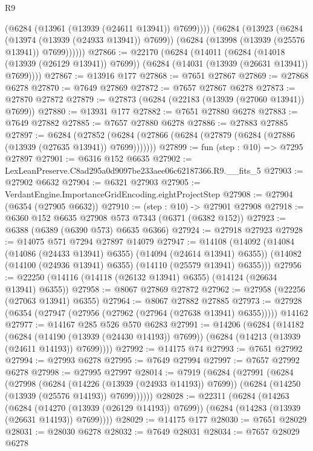 \begin{lexlean}{R9}
\begin{coremodule}
            (@6284 (@13961 (@13939 (@24611 @13941)) @7699))))
        (@6284
          (@13923
            (@6284 (@13974 (@13939 (@24933 @13941)) @7699))
            (@6284 (@13998 (@13939 (@25576 @13941)) @7699))))))
@27866 := @22170
    (@6284
      (@14011
        (@6284 (@14018 (@13939 (@26129 @13941)) @7699))
        (@6284 (@14031 (@13939 (@26631 @13941)) @7699))))
@27867 := @13916 @177
@27868 := @7651 @27867
@27869 := @27868 @6278
@27870 := @7649 @27869
@27872 := @7657 @27867 @6278
@27873 := @27870 @27872
@27879 := @27873 (@6284 (@22183 (@13939 (@27060 @13941)) @7699))
@27880 := @13931 @177
@27882 := @7651 @27880 @6278
@27883 := @7649 @27882
@27885 := @7657 @27880 @6278
@27886 := @27883 @27885
@27897 := @6284
    (@27852 (@6284 (@27866 (@6284 (@27879 (@6284 (@27886 (@13939 (@27635 @13941)) @7699)))))))
@27899 := fun (step : @10) => @7295 @27897
@27901 := @6316 @152 @6635
@27902 := LexLeanPreserve.C8ad295a0d9097be233aee06c62187366.R9.__fits_5
@27903 := @27902 @6632
@27904 := @6321 @27903
@27905 := VerdantEngine.ImportanceGridEncoding.eightProjectStep
@27908 := @27904 (@6354 (@27905 @6632))
@27910 := (step : @10) -> @27901 @27908
@27918 := @6360 @152 @6635 @27908 @573 @7343 (@6371 (@6382 @152))
@27923 := @6388 (@6389 (@6390 @573) @6635 @6366)
@27924 := @27918 @27923
@27928 := @14075 @571 @7294 @27897 @14079
@27947 := @14108
    (@14092
      (@14084 (@14086 (@24433 @13941) @6355) (@14094 (@24614 @13941) @6355))
      (@14082 (@14100 (@24936 @13941) @6355) (@14110 (@25579 @13941) @6355)))
@27956 := @22250 (@14116 (@14118 (@26132 @13941) @6355) (@14124 (@26634 @13941) @6355))
@27958 := @8067 @27869 @27872
@27962 := @27958 (@22256 (@27063 @13941) @6355)
@27964 := @8067 @27882 @27885
@27973 := @27928 (@6354 (@27947 (@27956 (@27962 (@27964 (@27638 @13941) @6355))))) @14162
@27977 := @14167 @285 @526 @570 @6283
@27991 := @14206
    (@6284
      (@14182
        (@6284 (@14190 (@13939 (@24430 @14193)) @7699))
        (@6284 (@14213 (@13939 (@24611 @14193)) @7699))))
@27992 := @14175 @74
@27993 := @7651 @27992
@27994 := @27993 @6278
@27995 := @7649 @27994
@27997 := @7657 @27992 @6278
@27998 := @27995 @27997
@28014 := @7919
    (@6284
      (@27991
        (@6284
          (@27998
            (@6284 (@14226 (@13939 (@24933 @14193)) @7699))
            (@6284 (@14250 (@13939 (@25576 @14193)) @7699))))))
@28028 := @22311
    (@6284
      (@14263
        (@6284 (@14270 (@13939 (@26129 @14193)) @7699))
        (@6284 (@14283 (@13939 (@26631 @14193)) @7699))))
@28029 := @14175 @177
@28030 := @7651 @28029
@28031 := @28030 @6278
@28032 := @7649 @28031
@28034 := @7657 @28029 @6278

\end{coremodule}
\end{lexlean}
